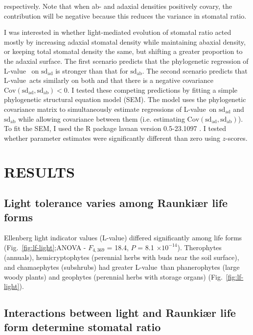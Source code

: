 \documentclass[12pt, oneside]{article}
\newcommand{\pkg}[1]{{\fontseries{b}\selectfont #1}}
\newcommand{\el}{L-value}
\begin{document}
respectively. Note that when ab- and adaxial densities positively covary, the contribution will be negative because this reduces the variance in stomatal ratio.

I was interested in whether light-mediated evolution of stomatal ratio acted mostly by increasing adaxial stomatal density while maintaining abaxial density, or keeping total stomatal density the same, but shifting a greater proportion to the adaxial surface. The first scenario predicts that the phylogenetic regression of \el~ on $\mathrm{sd_{ad}}$ is stronger than that for $\mathrm{sd_{ab}}$. The second scenario predicts that \el~acts similarly on both and that there is a negative covariance $\mathrm{Cov(sd_{ad}, sd_{ab}) < 0}$. I tested these competing predictions by fitting a simple phylogenetic structural equation model (SEM). The model uses the phylogenetic covariance matrix to simultaneously estimate regressions of \el~on $\mathrm{sd_{ad}}$ and $\mathrm{sd_{ab}}$ while allowing covariance between them (i.e. estimating $\mathrm{Cov(sd_{ad}, sd_{ab})}$). To fit the SEM, I used the R package \pkg{lavaan} version 0.5-23.1097 \citep{Rosseel_2012}. I tested whether parameter estimates were significantly different than zero using $z$-scores.

  
  


\section*{RESULTS}

\subsection*{Light tolerance varies among Raunki\ae r life forms}

Ellenberg light indicator values (\el) differed significantly among life forms (Fig.~\ref{fig:lf-light};ANOVA - $F_{4, 369}$ = 18.4, $P$ = 8.1 $\times10^{-14}$). Therophytes (annuals), hemicryptophytes (perennial herbs with buds near the soil surface), and chamaephytes (subshrubs) had greater \el~than phanerophytes (large woody plants) and geophytes (perennial herbs with storage organs) (Fig.~\ref{fig:lf-light}).

\subsection*{Interactions between light and Raunki\ae r life form determine stomatal ratio}
\end{document}
